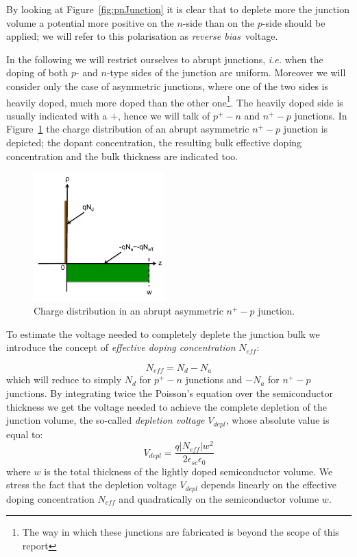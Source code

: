 By looking at Figure~\ref{fig:pnJunction} it is clear that to deplete more the junction volume 
a potential more positive on the $n$-side than on the $p$-side should be applied; we will refer 
to this polarisation as {\it reverse bias}~voltage.

In the following we will restrict ourselves to abrupt junctions, {\it i.e.} when the doping of both $p$- 
and $n$-type sides of the junction are uniform. Moreover we will consider only the case of 
asymmetric junctions, where one of the two sides is heavily doped, much more doped than the 
other one\footnote{The way in which these junctions are fabricated is beyond the scope of this 
report}. The heavily doped side is usually indicated with a $+$, hence we will talk of 
$p^+-n$ and $n^+-p$ junctions. In Figure~\ref{fig:AAJunction} the charge distribution of 
an abrupt asymmetric $n^+-p$ junction is depicted; the dopant concentration, the 
resulting bulk effective doping concentration and the bulk thickness are indicated too.

\begin{figure}[htbp]
   \centering
   \includegraphics[width=0.45\textwidth]{Abrupt_Junction.pdf} 
      \caption{\label{fig:AAJunction}Charge distribution in an abrupt asymmetric $n^+-p$ junction.}
\end{figure}

To estimate the voltage needed to completely deplete the junction bulk we introduce the concept 
of {\it effective doping concentration} $N_{eff}$:

\begin{equation}
N_{eff} = N_d-N_a
\label{eq:Neff}
\end{equation}
which will reduce to simply $N_d$ for $p^+-n$ junctions and $-N_a$ for $n^+-p$ junctions.
By integrating twice the Poisson's equation over the semiconductor thickness we get 
the voltage needed to achieve the complete depletion of the 
junction volume, the so-called {\it depletion voltage} $V_{depl}$, whose absolute value is equal to:
\begin{equation}
V_{depl}=\dfrac{q|N_{eff}|w^2}{2\epsilon_{sc}\epsilon_0}
\label{eq:vdepl}
\end{equation} 
 where $w$ is the total thickness of the lightly doped semiconductor volume. We stress 
 the fact that the depletion voltage $V_{depl}$ depends linearly on the effective doping 
 concentration $N_{eff}$ and quadratically on the semiconductor volume $w$.

